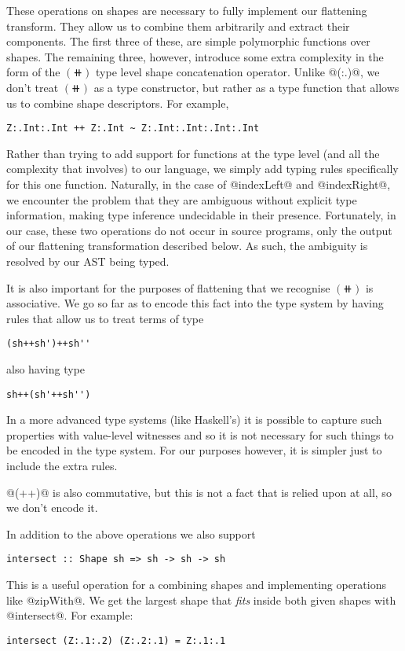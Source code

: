 These operations on shapes are necessary to fully implement our flattening transform. They allow us to combine them arbitrarily and extract their components. The first three of these, are simple polymorphic functions over shapes. The remaining three, however, introduce some extra complexity in the form of the $(\doubleplus)$ type level shape concatenation operator. Unlike @(:.)@, we don't treat $(\doubleplus)$ as a type constructor, but rather as a type function that allows us to combine shape descriptors. For example,
%
\begin{lstlisting}[style=ndp]
Z:.Int:.Int ++ Z:.Int ~ Z:.Int:.Int:.Int:.Int
\end{lstlisting}

Rather than trying to add support for functions at the type level (and all the complexity that involves) to our language, we simply add typing rules specifically for this one function. Naturally, in the case of @indexLeft@ and @indexRight@, we encounter the problem that they are ambiguous without explicit type information, making type inference undecidable in their presence. Fortunately, in our case, these two operations do not occur in source programs, only the output of our flattening transformation described below. As such, the ambiguity is resolved by our AST being typed.

It is also important for the purposes of flattening that we recognise $(\doubleplus)$ is associative. We go so far as to encode this fact into the type system by having rules that allow us to treat terms of type
%
\begin{lstlisting}[style=ndp]
(sh++sh')++sh''
\end{lstlisting}
%
also having type
%
\begin{lstlisting}[style=ndp]
sh++(sh'++sh'')
\end{lstlisting}

In a more advanced type systems (like Haskell's) it is possible to capture such properties with value-level witnesses and so it is not necessary for such things to be encoded in the type system. For our purposes however, it is simpler just to include the extra rules.

@(++)@ is also commutative, but this is not a fact that is relied upon at all, so we don't encode it.

In addition to the above operations we also support
%
\begin{lstlisting}
intersect :: Shape sh => sh -> sh -> sh
\end{lstlisting}
%
This is a useful operation for a combining shapes and implementing operations like @zipWith@. We get the largest shape that \emph{fits} inside both given shapes with @intersect@. For example:
%
\begin{lstlisting}
intersect (Z:.1:.2) (Z:.2:.1) = Z:.1:.1
\end{lstlisting}

